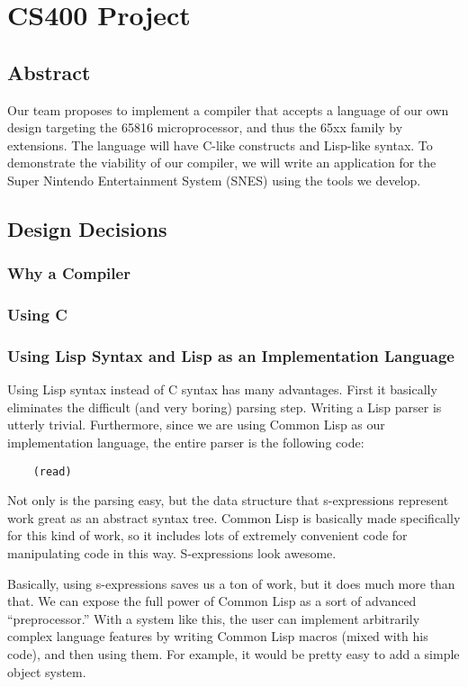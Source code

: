 \documentclass {article}
\begin{document}
\section {CS400 Project}
\subsection{Abstract}

Our team proposes to implement a compiler that accepts a language of
our own design targeting the 65816 microprocessor, and thus the 65xx
family by extensions.  The language will have C-like constructs and
Lisp-like syntax.  To demonstrate the viability of our compiler, we
will write an application for the Super Nintendo Entertainment System
(SNES) using the tools we develop.

\subsection{Design Decisions}
\subsubsection{Why a Compiler}
\subsubsection{Using C}
\subsubsection{Using Lisp Syntax and Lisp as an Implementation Language}

Using Lisp syntax instead of C syntax has many advantages.  First it
basically eliminates the difficult (and very boring) parsing step.
Writing a Lisp parser is utterly trivial.  Furthermore, since we are
using Common Lisp as our implementation language, the entire parser is
the following code:

\begin{verbatim}
    (read)
\end{verbatim}

Not only is the parsing easy, but the data structure that
s-expressions represent work great as an abstract syntax tree.  Common
Lisp is basically made specifically for this kind of work, so it
includes lots of extremely convenient code for manipulating code in
this way.  S-expressions look awesome.

Basically, using s-expressions saves us a ton of work, but it does
much more than that.  We can expose the full power of Common Lisp as a
sort of advanced ``preprocessor.''  With a system like this, the user
can implement arbitrarily complex language features by writing Common
Lisp macros (mixed with his code), and then using them.  For example,
it would be pretty easy to add a simple object system.
\end{document}
